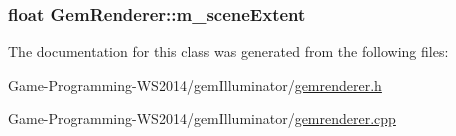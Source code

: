 \subsubsection[{m\+\_\+scene\+Extent}]{\setlength{\rightskip}{0pt plus 5cm}float Gem\+Renderer\+::m\+\_\+scene\+Extent\hspace{0.3cm}{\ttfamily [protected]}}\label{class_gem_renderer_a24391e7dfe1663b9c74210fb0424487d}


The documentation for this class was generated from the following files\+:\begin{DoxyCompactItemize}
\item 
Game-\/\+Programming-\/\+W\+S2014/gem\+Illuminator/\hyperlink{gemrenderer_8h}{gemrenderer.\+h}\item 
Game-\/\+Programming-\/\+W\+S2014/gem\+Illuminator/\hyperlink{gemrenderer_8cpp}{gemrenderer.\+cpp}\end{DoxyCompactItemize}
